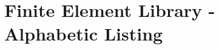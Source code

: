 \section*{Finite Element Library - Alphabetic Listing}     %
\vskip 10pt
\vskip 10pt\small\noindent                      

%
%

